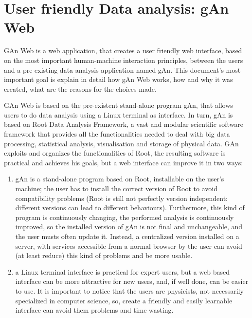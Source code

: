 \section{User friendly Data analysis: gAn Web}

GAn Web is a web application, that creates a user friendly web interface, based on the most important human-machine interaction principles, between the users and a pre-existing data analysis application named gAn.
This document's most important goal is explain in detail how gAn Web works, how and why it was created, what are the reasons for the choices made. 

GAn Web is based on the pre-existent stand-alone program gAn, that allows users to do data analysis using a Linux terminal as interface. In turn, gAn is based on Root Data Analysis Framework, a vast and modular scientific software framework that provides all the functionalities needed to deal with big data processing, statistical analysis, visualisation and storage of physical data. GAn exploits and organizes the functionalities of Root, the resulting software is practical and achieves his goals, but a web interface can improve it in two ways:

\begin{enumerate}

\item gAn is a stand-alone program based on Root, installable on the user's machine; the user has to install the correct version of Root to avoid compatibility problems (Root is still not perfectly version independent: different versions can lead to different behaviours). Furthermore, this kind of program is continuously changing, the performed analysis is continuously improved, so the installed version of gAn is not final and unchangeable, and the user musts often update it. Instead, a centralized version installed on a server, with services accessible from a normal browser by the user can avoid (at least reduce) this kind of problems and be more usable.    
 

\item a Linux terminal interface is practical for expert users, but a web based interface can be more attractive for new users, and, if well done, can be easier to use. It is important to notice that the users are physicists, not necessarily specialized in computer science, so, create a friendly and easily learnable interface can avoid them problems and time wasting.   


\end{enumerate}


